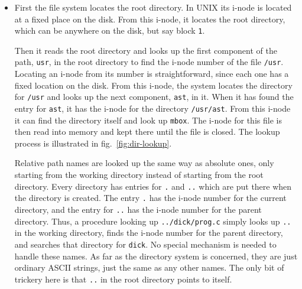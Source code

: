 \begin{itemize}
\item First the file system locates the root directory.  In UNIX its i-node is located at
  a fixed place on the disk. From this i-node, it locates the root directory, which can be
  anywhere on the disk, but say block \texttt{1}.

  Then it reads the root directory and looks up the first component of the path,
  \texttt{usr}, in the root directory to find the i-node number of the file
  \texttt{/usr}. Locating an i-node from its number is straightforward, since each one has a
  fixed location on the disk. From this i-node, the system locates the directory for
  \texttt{/usr} and looks up the next component, \texttt{ast}, in it. When it has found the
  entry for \texttt{ast}, it has the i-node for the directory \texttt{/usr/ast}. From this
  i-node it can find the directory itself and look up \texttt{mbox}. The i-node for this
  file is then read into memory and kept there until the file is closed. The lookup
  process is illustrated in fig.~\ref{fig:dir-lookup}.

  Relative path names are looked up the same way as absolute ones, only starting from the
  working directory instead of starting from the root directory. Every directory has
  entries for \texttt{.} and \texttt{..} which are put there when the directory is created.
  The entry \texttt{.} has the i-node number for the current directory, and the entry for
  \texttt{..}  has the i-node number for the parent directory. Thus, a procedure looking up
  \texttt{../dick/prog.c} simply looks up \texttt{..} in the working directory, finds the
  i-node number for the parent directory, and searches that directory for \texttt{dick}. No
  special mechanism is needed to handle these names. As far as the directory system is
  concerned, they are just ordinary ASCII strings, just the same as any other names. The
  only bit of trickery here is that \texttt{..} in the root directory points to itself.
\end{itemize}


